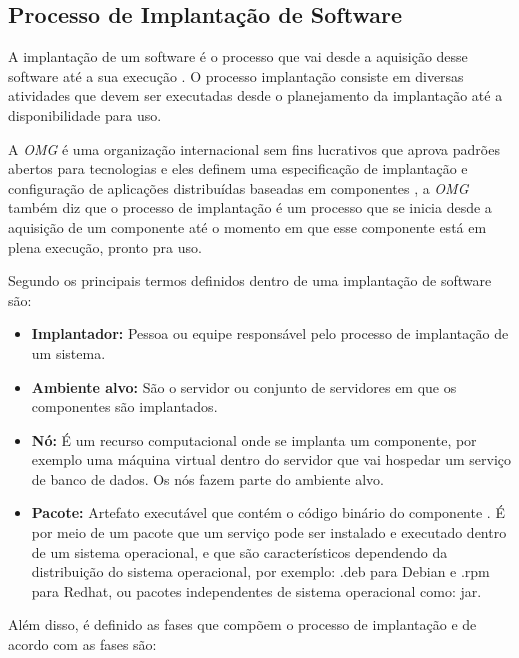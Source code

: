 \subsection{Processo de Implantação de Software}

A implantação de um software é o processo que vai desde a aquisição desse software
até a sua execução \cite{leo2014}. O processo implantação consiste em diversas
atividades que devem ser executadas desde o planejamento da implantação até a
disponibilidade para uso.

A \textit{OMG} é uma organização internacional sem fins lucrativos
que aprova padrões abertos para tecnologias e eles definem uma especificação de
implantação e configuração de aplicações distribuídas baseadas em componentes \cite{omg2006},
a \textit{OMG} também diz que o processo de implantação é um processo que se inicia desde
a aquisição de um componente até o momento em que esse componente está em plena
execução, pronto pra uso.

Segundo \cite{omg2006} os principais termos definidos dentro de uma implantação
de software são:

\begin{itemize}
  \item  \textbf{Implantador:} Pessoa ou equipe responsável pelo processo de
  implantação  de um sistema.
  \item  \textbf{Ambiente alvo:} São o servidor ou conjunto de servidores em
  que os componentes são implantados.
  \item  \textbf{Nó:} É um recurso computacional onde se implanta um componente,
  por exemplo uma máquina virtual dentro do servidor que vai hospedar um serviço
  de banco de dados. Os nós fazem parte do ambiente alvo.
  \item  \textbf{Pacote:} Artefato executável que contém o código binário do componente
  . É por meio de um pacote que um serviço pode ser instalado e executado dentro
  de um sistema operacional, e que são característicos dependendo da distribuição
  do sistema operacional, por exemplo: .deb para Debian e .rpm para Redhat, ou
  pacotes independentes de sistema operacional como: jar.
\end{itemize}

Além disso, é definido as fases que compõem o processo de implantação e de acordo
com \cite{omg2006} as fases são:

